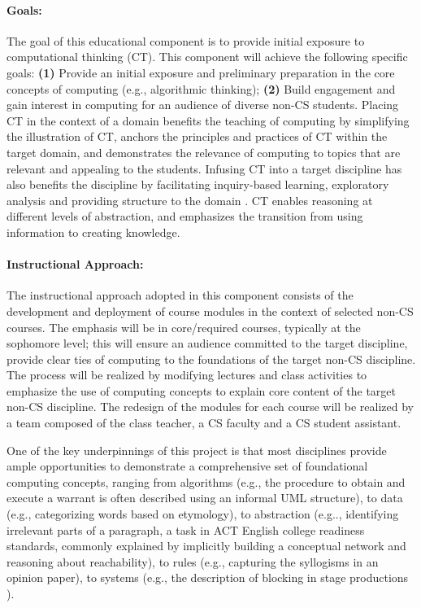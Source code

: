 \paragraph{Goals:} The goal of this educational component is to provide initial exposure to computational thinking (CT). This component will achieve the following specific goals: {\bf (1)} Provide an initial exposure and preliminary preparation in the core concepts of computing (e.g., algorithmic thinking); 
{\bf (2)} Build engagement and gain interest in computing for an audience of diverse non-CS students.
Placing CT in the context of a domain benefits the teaching of computing by simplifying the
illustration of CT, anchors the principles and practices of CT within the target domain, and demonstrates the relevance of computing to topics that are relevant and appealing to the students.
Infusing CT into a target discipline has also benefits the discipline by  facilitating inquiry-based learning, exploratory analysis and providing structure to the
domain \cite{ep71,ep150}.  CT enables reasoning at different levels of abstraction, and emphasizes the transition from
using information to creating knowledge.

\paragraph{Instructional Approach:}
The instructional approach adopted in this component consists of the development and deployment of course modules in the context of selected non-CS courses. The emphasis will be in core/required courses, typically at the sophomore level; this will ensure an  audience committed to the target discipline, provide clear ties of computing to the foundations of the target non-CS discipline. 
The  process will be realized by modifying lectures and class activities to emphasize the use of computing concepts to explain core content of the target non-CS discipline. The redesign of the modules for each course will be realized by a team composed of the class teacher, a CS faculty and a CS student assistant.  

One of the key underpinnings of this project
is that most disciplines  provide ample opportunities to demonstrate 
a comprehensive set of foundational computing concepts,  ranging from algorithms (e.g., the procedure to obtain and execute a warrant is often  described using an informal UML structure), to data (e.g., categorizing words based on
etymology), to abstraction (e.g.., identifying irrelevant
parts of a paragraph, a task in ACT English college
readiness standards, commonly explained by implicitly
building a conceptual network and reasoning about
reachability), to rules (e.g., capturing the syllogisms in
an opinion paper), to systems (e.g., the description of
blocking in stage productions \cite{ep115}).

